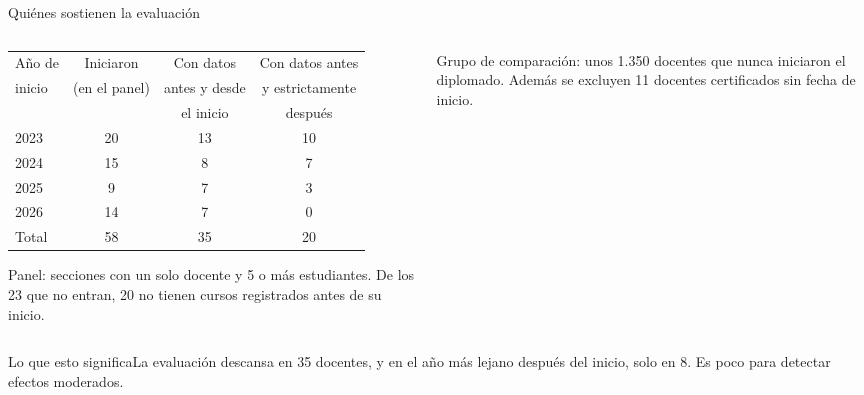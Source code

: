 \documentclass[10pt,aspectratio=169]{beamer}
\newcommand{\sintesis}[2]{%
  \begin{block}{#1}#2\end{block}}
\begin{document}
\begin{frame}{Quiénes sostienen la evaluación}
  \begin{columns}[c]
    \begin{column}{0.53\textwidth}
      \begin{table}\footnotesize
        \begin{tabular}{lccc}
          \toprule
          Año de & Iniciaron & Con datos & Con datos antes \\
          inicio & (en el panel) & antes y desde & y estrictamente \\
          & & el inicio & después \\
          \midrule
          2023 & 20 & 13 & 10 \\
          2024 & 15 & 8 & 7 \\
          2025 & 9 & 7 & 3 \\
          2026 & 14 & 7 & 0 \\
          \midrule
          Total & 58 & \alert{35} & 20 \\
          \bottomrule
        \end{tabular}
      \end{table}
      {\scriptsize Panel: secciones con un solo docente y 5 o más estudiantes. De los 23 que no entran, 20 no tienen cursos registrados antes de su inicio.}
    \end{column}
    \begin{column}{0.45\textwidth}
      \begin{center}
      \end{center}
      {\scriptsize Grupo de comparación: unos 1.350 docentes que nunca iniciaron el diplomado. Además se excluyen 11 docentes certificados sin fecha de inicio.}
    \end{column}
  \end{columns}
  \vspace{0.2em}
  \sintesis{Lo que esto significa}{La evaluación descansa en 35 docentes, y en el año más lejano después del inicio, solo en 8. Es poco para detectar efectos moderados.}
\end{frame}
\end{document}
